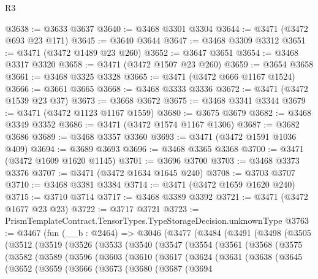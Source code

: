 \begin{lexlean}{R3}
\begin{coremodule}
@3638 := @3633 @3637
@3640 := @3468 @3301 @3304
@3644 := @3471 (@3472 @693 @23 @171)
@3645 := @3640 @3644
@3647 := @3468 @3309 @3312
@3651 := @3471 (@3472 @1489 @23 @260)
@3652 := @3647 @3651
@3654 := @3468 @3317 @3320
@3658 := @3471 (@3472 @1507 @23 @260)
@3659 := @3654 @3658
@3661 := @3468 @3325 @3328
@3665 := @3471 (@3472 @666 @1167 @1524)
@3666 := @3661 @3665
@3668 := @3468 @3333 @3336
@3672 := @3471 (@3472 @1539 @23 @37)
@3673 := @3668 @3672
@3675 := @3468 @3341 @3344
@3679 := @3471 (@3472 @1123 @1167 @1559)
@3680 := @3675 @3679
@3682 := @3468 @3349 @3352
@3686 := @3471 (@3472 @1574 @1167 @1306)
@3687 := @3682 @3686
@3689 := @3468 @3357 @3360
@3693 := @3471 (@3472 @1591 @1036 @409)
@3694 := @3689 @3693
@3696 := @3468 @3365 @3368
@3700 := @3471 (@3472 @1609 @1620 @1145)
@3701 := @3696 @3700
@3703 := @3468 @3373 @3376
@3707 := @3471 (@3472 @1634 @1645 @240)
@3708 := @3703 @3707
@3710 := @3468 @3381 @3384
@3714 := @3471 (@3472 @1659 @1620 @240)
@3715 := @3710 @3714
@3717 := @3468 @3389 @3392
@3721 := @3471 (@3472 @1677 @23 @23)
@3722 := @3717 @3721
@3723 := PrismTemplateContract.TensorTypes.TypeStorageDecision.unknownType
@3763 := @3467
    (fun (__b : @2464) =>
    @3046
      (@3477
        (@3484
          (@3491
            (@3498
              (@3505
                (@3512
                  (@3519
                    (@3526
                      (@3533
                        (@3540
                          (@3547
                            (@3554
                              (@3561
                                (@3568
                                  (@3575
                                    (@3582
                                      (@3589
                                        (@3596
                                          (@3603
                                            (@3610
                                              (@3617
                                                (@3624
                                                  (@3631
                                                    (@3638
                                                      (@3645
                                                        (@3652
                                                          (@3659
                                                            (@3666
                                                              (@3673
                                                                (@3680
                                                                  (@3687
                                                                    (@3694

\end{coremodule}
\end{lexlean}
